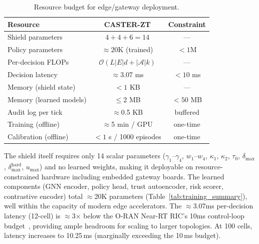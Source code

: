 \documentclass[10pt,journal,compsoc]{IEEEtran}
\begin{document}
\begin{table}[t]
\centering
\caption{Resource budget for edge/gateway deployment.}
\label{tab:resource_budget}
\begin{tabular}{lcc}
\toprule
Resource & CASTER-ZT & Constraint \\
\midrule
Shield parameters       & $4 + 4 + 6 = 14$  & --- \\
Policy parameters       & $\approx 20$K (trained) & $< 1$M \\
Per-decision FLOPs      & $\mathcal{O}(L|E|d + |\mathcal{A}|k)$ & --- \\
Decision latency        & $\approx$3.07 ms    & $< 10$ ms \\
Memory (shield state)   & $< 1$ KB           & --- \\
Memory (learned models) & $\le 2$ MB          & $< 50$ MB \\
Audit log per tick      & $\approx$0.5 KB     & buffered \\
Training (offline)      & $\approx$5 min / GPU & one-time \\
Calibration (offline)   & $< 1$ s / 1000 episodes & one-time \\
\bottomrule
\end{tabular}
\end{table}

\noindent The shield itself requires only 14 scalar parameters ($\gamma_1$--$\gamma_4$, $w_1$--$w_4$, $\kappa_1$, $\kappa_2$, $\tau_0$, $\delta_{\max}$, $\delta_{\max}^{\mathrm{hard}}$, $u_{\max}$) and no learned weights, making it deployable on resource-constrained hardware including embedded gateway boards.
The learned components (GNN encoder, policy head, trust autoencoder, risk scorer, contrastive encoder) total $\approx$20K parameters (Table~\ref{tab:training_summary}), well within the capacity of modern edge accelerators.
The $\approx$3.07ms per-decision latency (12-cell) is $\approx$3$\times$ below the O-RAN Near-RT RIC's 10ms control-loop budget~\cite{oran_official_architecture}, providing ample headroom for scaling to larger topologies.
At 100 cells, latency increases to 10.25\,ms (marginally exceeding the 10\,ms budget).
\end{document}
